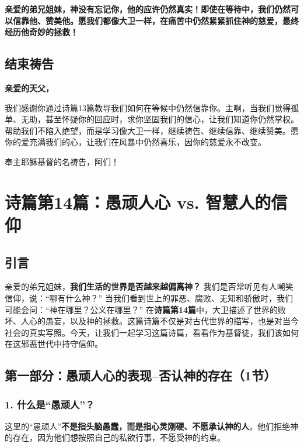 \documentclass[a4paper, 12pt]{article}
\begin{document}
\textbf{亲爱的弟兄姐妹，神没有忘记你，他的应许仍然真实！即使在等待中，我们仍然可以信靠他、赞美他。愿我们都像大卫一样，在痛苦中仍然紧紧抓住神的慈爱，最终经历他奇妙的拯救！}

\subsection*{结束祷告}  
\textbf{亲爱的天父，}

我们感谢你通过诗篇13篇教导我们如何在等候中仍然信靠你。主啊，当我们觉得孤单、无助，甚至怀疑你的回应时，求你坚固我们的信心，让我们知道你仍然掌权。帮助我们不陷入绝望，而是学习像大卫一样，继续祷告、继续信靠、继续赞美。愿你的爱充满我们的心，让我们在风暴中仍然喜乐，因你的慈爱永不改变。

奉主耶稣基督的名祷告，阿们！

\newpage

\section{诗篇第14篇：愚顽人心 vs. 智慧人的信仰} 

\subsection*{引言}
亲爱的弟兄姐妹，\textbf{我们生活的世界是否越来越偏离神？} 我们是否常听见有人嘲笑信仰，说：“哪有什么神？” 当我们看到世上的罪恶、腐败、无知和骄傲时，我们可能会问：“神在哪里？公义在哪里？” 在\textbf{诗篇第14篇}中，大卫描述了世界的败坏、人心的愚妄，以及神的拯救。这篇诗篇不仅是对古代世界的描写，也是对当今社会的真实写照。今天，让我们一起学习这篇诗篇，看看作为基督徒，我们该如何在这邪恶世代中持守信仰。  


\subsection*{第一部分：愚顽人心的表现--否认神的存在（1节）}

\subsubsection*{1. 什么是“愚顽人”？}
 
这里的“愚顽人”\textbf{不是指头脑愚蠢，而是指心灵刚硬、不愿承认神的人}。他们拒绝神的存在，因为他们想按照自己的私欲行事，不愿受神的约束。  
\end{document}
